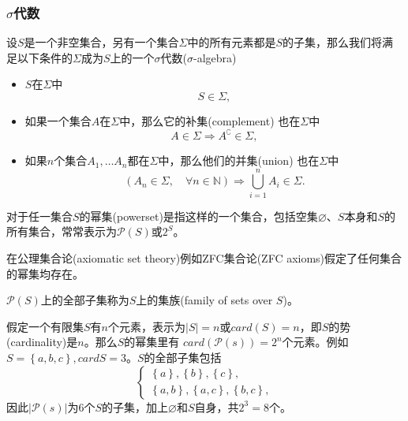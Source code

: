 \subsubsection{\texorpdfstring{$\sigma$}{SIGMA}代数}
\begin{definition}[sigma代数]
  \label{definition:measure-sigma-algebra}
设$S$是一个非空集合，另有一个集合$\Sigma$中的所有元素都是$S$的子集，那么我们将满足以下条件的$\Sigma$成为$S$上的一个$\sigma$代数($\sigma$-algebra) \citep[p.4]{Bogachev:2007wh, Bogachev:2007tn}
\begin{itemize}
  \item $S$在$\Sigma$中
  \begin{equation*}
    S \in \Sigma,
  \end{equation*}
  \item 如果一个集合$A$在$\Sigma$中，那么它的补集(complement) 也在$\Sigma$中
  \begin{equation*}
    A \in \Sigma \Rightarrow A^{\complement} \in \Sigma,
  \end{equation*}
  \item 如果$n$个集合$A_1, \ldots A_n$都在$\Sigma$中，那么他们的并集(union) 也在$\Sigma$中
  \begin{equation*}
    \left( A_n \in \Sigma , \quad  \forall n \in \mathbb{N} \right)
    \Rightarrow \bigcup_{i=1}^{n} A_{i} \in \Sigma.
  \end{equation*}
\end{itemize}
\end{definition}

\begin{definition}[幂集]
  \label{definition:measure-powerset}
  对于任一集合$S$的幂集(powerset)是指这样的一个集合，包括空集$\varnothing$、$S$本身和$S$的所有集合，常常表示为$\mathcal{P}(S)$或$2^{S}$。

  在公理集合论(axiomatic set theory)例如ZFC集合论(ZFC axioms)假定了任何集合的幂集均存在。

  $\mathcal{P}(S)$上的全部子集称为$S$上的集族(family of sets over $S$)。
\end{definition}

假定一个有限集$S$有$n$个元素，表示为$|S|=n$或$card(S)=n$，即$S$的势(cardinality)是$n$。那么$S$的幂集里有 $card(\mathcal{P}(s)) = 2^n$个元素。例如$S=\left\{a,b,c\right\}, card{S}=3$。$S$的全部子集包括
\begin{equation*}
  \begin{cases}
    \left\{ a \right\}, \left\{ b\right\},\left\{c\right\}, \\
    \left\{ a,b \right\},\left\{ a,c \right\},\left\{ b,c \right\},
  \end{cases}
\end{equation*}
因此$\left| \mathcal{P}(s) \right|$为6个$S$的子集，加上$\varnothing$和$S$自身，共$2^3=8$个。

